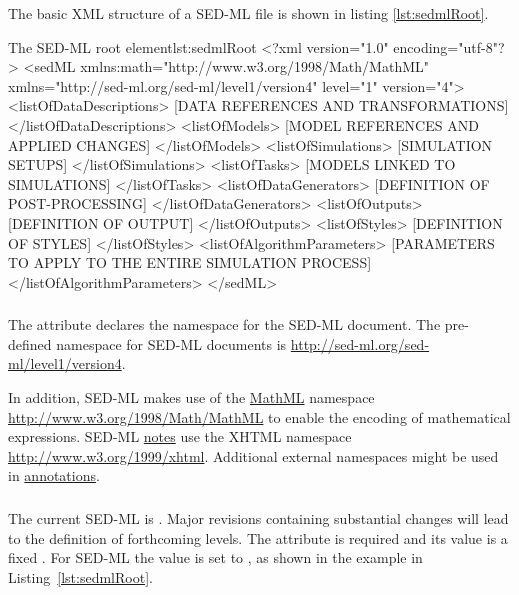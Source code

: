 

The basic XML structure of a SED-ML file is shown in listing \vref{lst:sedmlRoot}.

\begin{myXmlLst}{The SED-ML root element}{lst:sedmlRoot}
<?xml version="1.0" encoding="utf-8"?>
<sedML xmlns:math="http://www.w3.org/1998/Math/MathML" 
       xmlns="http://sed-ml.org/sed-ml/level1/version4" level="1" version="4">
	<listOfDataDescriptions>
	  	[DATA REFERENCES AND TRANSFORMATIONS]
  	</listOfDataDescriptions>
	<listOfModels>
		[MODEL REFERENCES AND APPLIED CHANGES]	 	
 	</listOfModels>
	<listOfSimulations>
		[SIMULATION SETUPS]
	</listOfSimulations>
	<listOfTasks>
		[MODELS LINKED TO SIMULATIONS]
	</listOfTasks>
	<listOfDataGenerators>
		[DEFINITION OF POST-PROCESSING]
	</listOfDataGenerators>
	<listOfOutputs>
		[DEFINITION OF OUTPUT]
	</listOfOutputs>
	<listOfStyles>
		[DEFINITION OF STYLES]
	</listOfStyles>
	<listOfAlgorithmParameters>
		[PARAMETERS TO APPLY TO THE ENTIRE SIMULATION PROCESS]
	</listOfAlgorithmParameters>
</sedML>
\end{myXmlLst}

\subsubsection{}
\label{sec:xmlns}
The  attribute declares the namespace for the SED-ML document. The pre-defined namespace for SED-ML documents is \url{http://sed-ml.org/sed-ml/level1/version4}. 

In addition, SED-ML makes use of the \hyperref[sec:mathML]{MathML} namespace \url{http://www.w3.org/1998/Math/MathML} to enable the encoding of mathematical expressions. SED-ML \hyperref[class:notes]{notes} use the XHTML namespace \url{http://www.w3.org/1999/xhtml}. Additional external namespaces might be used in \hyperref[class:annotation]{annotations}.

\subsubsection{}
\label{sec:level}
The current SED-ML  is \code{\level}. Major revisions containing substantial changes will lead to the definition of forthcoming levels. The  attribute is required and its value is a fixed . For SED-ML \currentLV the value is set to \code{\level}, as shown in the example in Listing~\ref{lst:sedmlRoot}.


